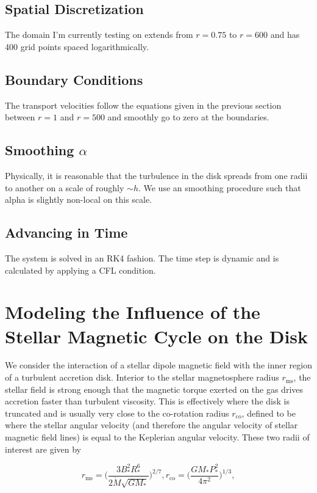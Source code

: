 \subsection{Spatial Discretization}
The domain I'm currently testing on extends from $r=0.75$ to $r=600$ and has 400 grid points spaced logarithmically. 


\subsection{Boundary Conditions}
The transport velocities follow the equations given in the previous section between $r=1$ and $r=500$ and smoothly go to zero at the boundaries.  


\subsection{Smoothing $\alpha$}
Physically, it is reasonable that the turbulence in the disk spreads from one radii to another on a scale of roughly $\sim h$.  We use an smoothing procedure such that alpha is slightly non-local on this scale. 


\subsection{Advancing in Time}
The system is solved in an RK4 fashion.  The time step is dynamic and is calculated by applying a CFL condition. 




\newpage
\section{Modeling the Influence of the Stellar Magnetic Cycle on the Disk}
We consider the interaction of a stellar dipole magnetic field with the inner region of a turbulent accretion disk. Interior to the stellar magnetosphere radius $r_{\text{ms}}$, the stellar field is strong enough that the magnetic torque exerted on the gas drives accretion faster than turbulent viscosity.  This is effectively where the disk is truncated and is usually very close to the co-rotation radius $r_{\text{co}}$, defined to be where the stellar angular velocity (and therefore the angular velocity of stellar magnetic field lines) is equal to the Keplerian angular velocity.  These two radii of interest are given by

\begin{equation}
r_{\text{ms}} = \Bigg(\frac{3 B_*^2 R_*^6}{2 \dot{M} \sqrt{G M_*}}\Bigg)^{2/7}, r_{\text{co}} = \Bigg( \frac{G M_* P_*^2}{4\pi^2} \Bigg)^{1/3},
\end{equation} 

